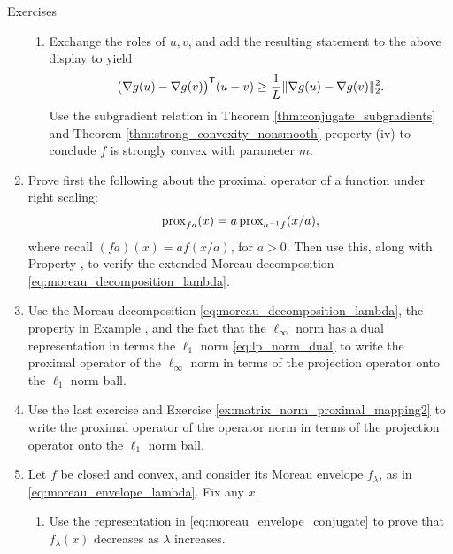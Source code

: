 \begin{xcb}{Exercises}
\begin{enumerate}[label=\thechapter.\arabic*]
\begin{enumerate}[label=\alph*.]
\item Exchange the roles of $u,v$, and add the resulting statement to the above
  display to yield 
  \[
  \big(\nabla g(u) - \nabla g(v)\big)^{\mathsf{T}} (u-v) \geq \frac{1}{L}\|\nabla g(u) -
  \nabla g(v)\|_2^2. 
  \]
  Use the subgradient relation in Theorem \ref{thm:conjugate_subgradients} and
  Theorem \ref{thm:strong_convexity_nonsmooth} property (iv) to conclude $f$ is
  strongly convex with parameter $m$. 
\end{enumerate}

\item \label{ex:moreau_decomposition_lambda}
  Prove first the following about the proximal operator of a function under
  right scaling: 
  \[
  \operatorname{prox}_{fa}(x) = a \operatorname{prox}_{a^{-1} f} (x/a), 
  \] 
  where recall $(fa)(x) = a f(x/a)$, for $a>0$. Then use this, along with
  Property , to verify the extended Moreau
  decomposition \eqref{eq:moreau_decomposition_lambda}.  

\item \label{ex:linf_norm_proximal_mapping}
  Use the Moreau decomposition \eqref{eq:moreau_decomposition_lambda}, the 
  property in Example , and the fact that the
  $\ell_\infty$ norm has a dual representation in terms the $\ell_1$ norm
  \eqref{eq:lp_norm_dual} to write the proximal operator of the $\ell_\infty$
  norm in terms of the projection operator onto the $\ell_1$ norm ball. 

\item \label{ex:operator_norm_proximal_mapping} 
  Use the last exercise and Exercise \ref{ex:matrix_norm_proximal_mapping2} to
  write the proximal operator of the operator norm in terms of the projection
  operator onto the $\ell_1$ norm ball.   

\item \label{ex:moreau_envelope_conjugate}
  Let $f$ be closed and convex, and consider its Moreau envelope $f_\lambda$, as
  in \eqref{eq:moreau_envelope_lambda}. Fix any $x$.

\begin{enumerate}[label=\alph*.]
\item Use the representation in \eqref{eq:moreau_envelope_conjugate} to prove
  that $f_\lambda(x)$ decreases as $\lambda$ increases.   


\end{enumerate}
\end{enumerate}
\end{xcb}
